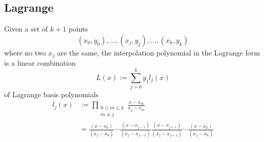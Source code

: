 \subsection{Lagrange}

Given a set of $k+1$ points
$$(x_0, y_0), \dots, (x_j, y_j), \dots, (x_k, y_k)$$
where no two $x_j$ are the same, the interpolation polynomial in the Lagrange form is a linear combination
$$L(x) := \sum_{j=0}^{k}{y_jl_j(x)}$$
of Lagrange basis polynomials
\begin{align*}
l_j(x) &:= \prod_{\substack{0 \leq m \leq k \\ m \neq j}} \frac{x - x_m}{x_j - x_m} \\
&= \frac{(x-x_0)}{(x_j-x_0)} \cdots \frac{(x-x_{j-1})}{(x_j-x_{j-1})} \frac{(x-x_{j+1})}{(x_j-x_{j+1})} \cdots \frac{(x-x_k)}{(x_j-x_k)}
\end{align*}
